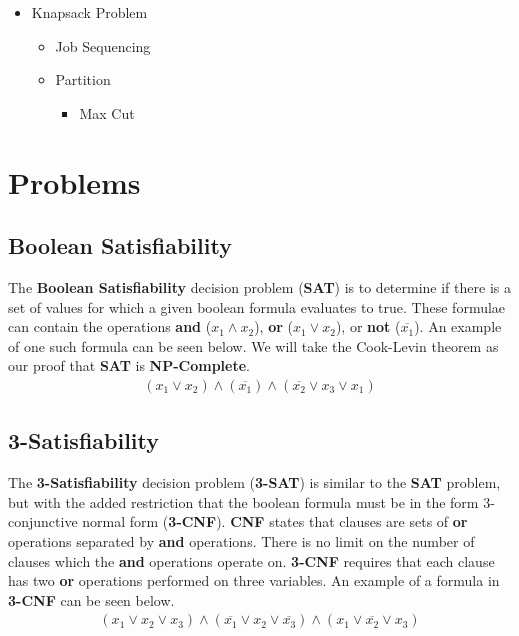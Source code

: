 \begin{itemize}
\begin{itemize}
\begin{itemize}
\begin{itemize}
\begin{itemize}
                        \item Knapsack Problem
                        \begin{itemize}
                            \item Job Sequencing
                            \item Partition
                            \begin{itemize}
                                \item Max Cut
                            \end{itemize}
                        \end{itemize}
                    \end{itemize}
                \end{itemize}
            \end{itemize}
        \end{itemize}
    \end{itemize}

\section{Problems}
\subsection{Boolean Satisfiability}
    The \textbf{Boolean Satisfiability} decision problem (\textbf{SAT}) is to determine if there is a set of values for which a given boolean formula evaluates to true. These formulae can contain the operations \textbf{and} ($x_1 \land x_2$), \textbf{or} ($x_1 \lor x_2$), or \textbf{not} ($\overline{x_1}$). An example of one such formula can be seen below. We will take the Cook-Levin theorem as our proof that \textbf{SAT} is \textbf{NP-Complete}. 
    \begin{align*}
        (x_1 \lor x_2) \land (\overline{x_1}) \land (\overline{x_2} \lor x_3 \lor x_1)
    \end{align*}

\subsection{3-Satisfiability}
    The \textbf{3-Satisfiability} decision problem (\textbf{3-SAT}) is similar to the \textbf{SAT} problem, but with the added restriction that the boolean formula must be in the form 3-conjunctive normal form (\textbf{3-CNF}). \textbf{CNF} states that clauses are sets of \textbf{or} operations separated by \textbf{and} operations. There is no limit on the number of clauses which the \textbf{and} operations operate on. \textbf{3-CNF} requires that each clause has two \textbf{or} operations performed on three variables. An example of a formula in \textbf{3-CNF} can be seen below.
    \begin{align*}
        (x_1 \lor x_2 \lor x_3) \land (\overline{x_1} \lor x_2 \lor \overline{x_3}) \land (x_1 \lor \overline{x_2} \lor x_3)
    \end{align*}
